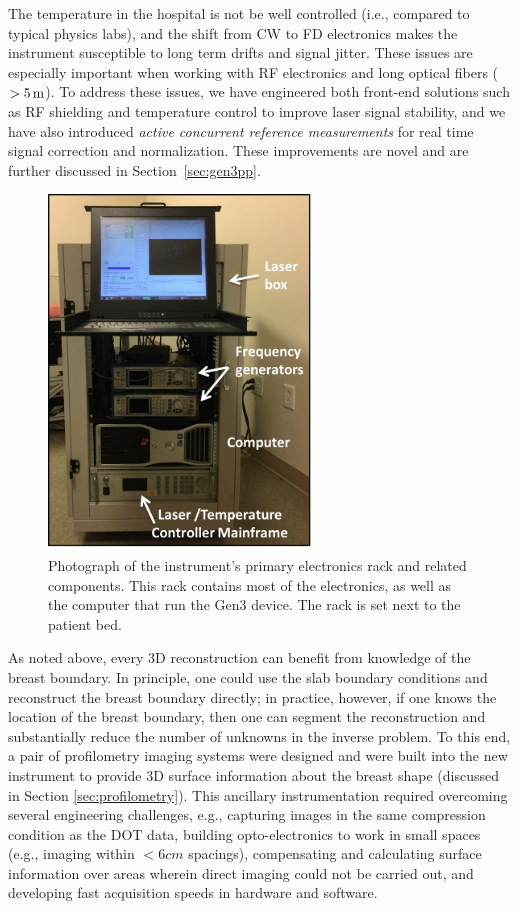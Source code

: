 The temperature in the hospital is not be well controlled (i.e., compared to typical physics labs), and the shift from CW to FD electronics makes the instrument susceptible to long term drifts and signal jitter. These issues are especially important when working with RF electronics and long optical fibers ($>5\,{\rm m}$). To address these issues, we have engineered both front-end solutions such as RF shielding and temperature control to improve laser signal stability, and we have also introduced \textit{active concurrent reference measurements} for real time signal correction and normalization. These improvements are novel and are further discussed in Section~\ref{sec:gen3pp}.
\begin{figure}[h]
\centering
\includegraphics[width=7cm]{./figures/4_Gen3/gen3rackpic.png}
\caption[Photograph of the instrument's primary electronics rack and related components]{Photograph of the instrument's primary electronics rack and related components. This rack contains most of the electronics, as well as the computer that run the Gen3 device. The rack is set next to the patient bed.}
\label{fig:gen3rackpic}
\end{figure}

As noted above, every 3D reconstruction can benefit from knowledge of the breast boundary. In principle, one could use the slab boundary conditions and reconstruct the breast boundary directly; in practice, however, if one knows the location of the breast boundary, then one can segment the reconstruction and substantially reduce the number of unknowns in the inverse problem. To this end, a pair of profilometry imaging systems were designed and were built into the new instrument to provide 3D surface information about the breast shape (discussed in Section \ref{sec:profilometry}). This ancillary instrumentation required overcoming several engineering challenges, e.g., capturing images in the same compression condition as the DOT data, building opto-electronics to work in  small spaces (e.g., imaging within $<6cm$ spacings), compensating and calculating surface information over areas wherein direct imaging could not be carried out, and developing fast acquisition speeds in hardware and software.

